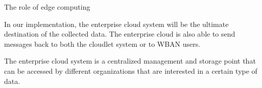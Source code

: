 \documentclass[10pt]{beamer}
\begin{document}
\begin{frame}{The role of edge computing} 

\vspace{0.3cm}

\begin{quoting}[font=itshape, begintext={``}, endtext={''\cite[par.~3.2]{MSAReport}}]
In our implementation, the enterprise cloud system will be the ultimate destination of the collected data. The enterprise cloud is also able to send messages back to both the cloudlet system or to WBAN users.
\end{quoting}

\vspace{0.3cm}

\begin{quoting}[font=itshape, begintext={``}, endtext={''\cite[par.~4.1]{MSAReport}}]
The enterprise cloud system is a centralized management and storage point that can be accessed by different organizations that are interested in a certain type of data.
\end{quoting}

\vspace{0.3cm}

\end{frame} 
\end{document}
